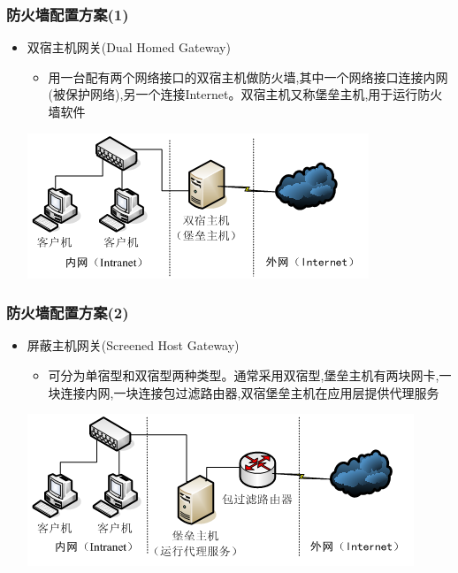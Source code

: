 \documentclass[xcolor=svgnames,presentation]{beamer}
\begin{document}
\begin{frame}
\frametitle{防火墙配置方案(1)}
\label{sec-1-5}
\begin{itemize}

\item 双宿主机网关(Dual Homed Gateway)
\label{sec-1-5-1}%
\begin{itemize}

\item 用一台配有两个网络接口的双宿主机做防火墙,其中一个网络接口连接内网(被保护网络),另一个连接Internet。双宿主机又称堡垒主机,用于运行防火墙软件
\label{sec-1-5-1-1}%
\end{itemize} %
\label{sec-1-5-1-2}

\includegraphics[width=.9\linewidth]{img/firewall5.png}
\end{itemize} %
\end{frame}
\begin{frame}
\frametitle{防火墙配置方案(2)}
\label{sec-1-6}
\begin{itemize}

\item 屏蔽主机网关(Screened Host Gateway)
\label{sec-1-6-1}%
\begin{itemize}

\item 可分为单宿型和双宿型两种类型。通常采用双宿型,堡垒主机有两块网卡,一块连接内网,一块连接包过滤路由器,双宿堡垒主机在应用层提供代理服务
\label{sec-1-6-1-1}%
\end{itemize} %
\label{sec-1-6-1-2}

\includegraphics[width=.9\linewidth]{img/firewall6.png}
\end{itemize} %
\end{frame}
\end{document}
